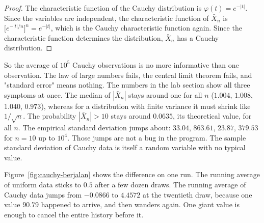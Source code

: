 \begin{proof}[Proof]
The characteristic function of the Cauchy distribution is $\varphi(t)=e^{-|t|}$.
Since the variables are independent, the characteristic function of $\bar X_n$ is
$\bigl[e^{-|t|/n}\bigr]^n=e^{-|t|}$, which is the Cauchy characteristic function
again. Since the characteristic function determines the distribution, $\bar X_n$ has
a Cauchy distribution.
\end{proof}

So the average of $10^5$ Cauchy observations is no more informative than one
observation. The law of large numbers fails, the central limit theorem fails, and
"standard error" means nothing. The numbers in the lab section show all three
symptoms at once. The median of $|\bar X_n|$ stays around one for all $n$
($1.004$, $1.008$, $1.040$, $0.973$), whereas for a distribution with finite
variance it must shrink like $1/\sqrt n$. The probability $|\bar X_n|>10$ stays
around $0.0635$, its theoretical value, for all $n$. The empirical standard
deviation jumps about: $33.04$, $863.61$, $23.87$, $379.53$ for $n=10$ up to
$10^4$. Those jumps are not a bug in the program. The sample standard deviation of
Cauchy data is itself a random variable with no typical value.

Figure~\ref{fig:cauchy-berjalan} shows the difference on one run. The running
average of uniform data sticks to $0.5$ after a few dozen draws. The running
average of Cauchy data jumps from $-0.0866$ to $4.4572$ at the twentieth draw,
because one value $90.79$ happened to arrive, and then wanders again. One giant
value is enough to cancel the entire history before it.

